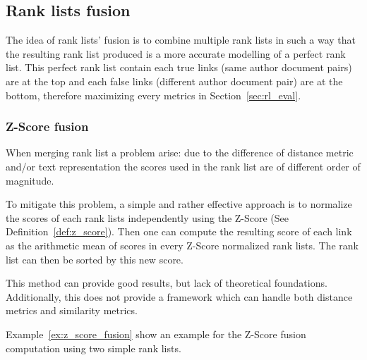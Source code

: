 \subsection{Rank lists fusion}
\label{sec:rank_lists_fusion}

The idea of rank lists' fusion is to combine multiple rank lists in such a way that the resulting rank list produced is a more accurate modelling of a perfect rank list.
This perfect rank list contain each true links (same author document pairs) are at the top and each false links (different author document pair) are at the bottom, therefore maximizing every metrics in Section~\ref{sec:rl_eval}.

\subsubsection{Z-Score fusion}

When merging rank list a problem arise: due to the difference of distance metric and/or text representation the scores used in the rank list are of different order of magnitude.

To mitigate this problem, a simple and rather effective approach is to normalize the scores of each rank lists independently using the Z-Score (See Definition~\ref{def:z_score}).
Then one can compute the resulting score of each link as the arithmetic mean of scores in every Z-Score normalized rank lists.
The rank list can then be sorted by this new score.

This method can provide good results, but lack of theoretical foundations.
Additionally, this does not provide a framework which can handle both distance metrics and similarity metrics.

Example~\ref{ex:z_score_fusion} show an example for the Z-Score fusion computation using two simple rank lists.

